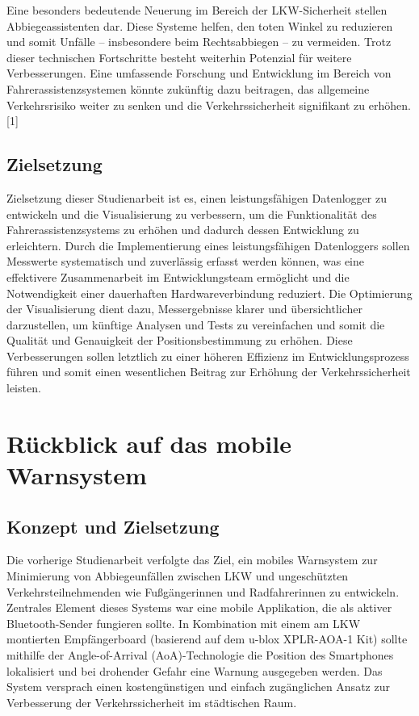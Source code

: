 \documentclass[a4paper, 12pt]{article} %
\begin{document}
Eine besonders bedeutende Neuerung im Bereich der LKW-Sicherheit stellen Abbiegeassistenten dar. 
Diese Systeme helfen, den toten Winkel zu reduzieren und somit Unfälle – insbesondere beim Rechtsabbiegen – zu vermeiden. 
Trotz dieser technischen Fortschritte besteht weiterhin Potenzial für weitere Verbesserungen. Eine umfassende Forschung und Entwicklung 
im Bereich von Fahrerassistenzsystemen könnte zukünftig dazu beitragen, das allgemeine Verkehrsrisiko weiter zu senken und die Verkehrssicherheit
signifikant zu erhöhen. [1]

\subsection{Zielsetzung}
Zielsetzung dieser Studienarbeit ist es, einen 
leistungsfähigen Datenlogger zu entwickeln und die Visualisierung 
zu verbessern, um die Funktionalität des Fahrerassistenzsystems zu erhöhen 
und dadurch dessen Entwicklung zu erleichtern. Durch die Implementierung eines 
leistungsfähigen Datenloggers sollen Messwerte systematisch und zuverlässig 
erfasst werden können, was eine effektivere Zusammenarbeit im Entwicklungsteam 
ermöglicht und die Notwendigkeit einer dauerhaften Hardwareverbindung reduziert. Die Optimierung der Visualisierung 
dient dazu, Messergebnisse klarer und übersichtlicher darzustellen, um künftige Analysen und Tests zu vereinfachen und somit
 die Qualität und Genauigkeit der Positionsbestimmung zu erhöhen. Diese Verbesserungen sollen letztlich zu einer höheren Effizienz
  im Entwicklungsprozess führen und 
somit einen wesentlichen Beitrag zur Erhöhung der Verkehrssicherheit leisten.


\section{Rückblick auf das mobile Warnsystem}
\subsection{Konzept und Zielsetzung}
Die vorherige Studienarbeit verfolgte das Ziel, ein mobiles Warnsystem zur Minimierung von 
Abbiegeunfällen zwischen LKW und ungeschützten Verkehrsteilnehmenden wie Fußgängerinnen und Radfahrerinnen zu entwickeln.
Zentrales Element dieses Systems war eine mobile Applikation, die als aktiver Bluetooth-Sender fungieren sollte. In Kombination 
mit einem am LKW montierten Empfängerboard (basierend auf dem u-blox XPLR-AOA-1 Kit) sollte mithilfe der Angle-of-Arrival (AoA)-Technologie 
die Position des Smartphones lokalisiert und bei drohender Gefahr eine Warnung ausgegeben werden. Das System versprach einen 
kostengünstigen und einfach zugänglichen Ansatz zur Verbesserung der Verkehrssicherheit im städtischen Raum.
\end{document}
